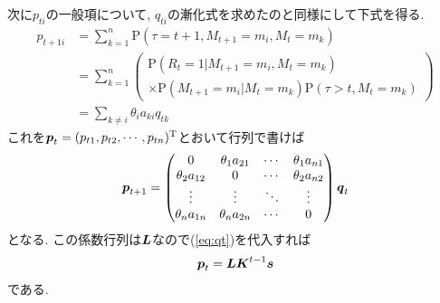 次に$ p_{t i} $の一般項について, $ q_{t i} $の漸化式を求めたのと同様にして下式を得る. 
\begin{align}
    p_{t+1 i} & =\sum_{k=1}^n \mathrm{P}(\tau = t + 1 , M_{t+1} = m_i , M_t = m_k) \\
    & =\sum_{k=1}^n \left(
        \begin{array}{l}
            \mathrm{P}(R_t=1 | M_{t+1}=m_i , M_t=m_k) \\
            \times \mathrm{P}(M_{t+1}=m_i | M_t=m_k) \mathrm{P}(\tau>t , M_t=m_k)
        \end{array}
    \right) \\
    & =\sum_{k \ne i} \theta_i a_{k i} q_{t k} \label{eq:pti_rec}
\end{align}
これを$ \boldsymbol{p}_t = (p_{t 1} , p_{t 2} , \cdots , p_{t n})^\mathrm{T} $とおいて行列で書けば
\begin{equation}
    \boldsymbol{p}_{t + 1} = 
    \begin{pmatrix}
        0 & \theta_1 a_{2 1} & \cdots & \theta_1 a_{n 1} \\
        \theta_2 a_{1 2} & 0 & \cdots & \theta_2 a_{n 2} \\
        \vdots & \vdots & \ddots & \vdots \\
        \theta_n a_{1 n} & \theta_n a_{2 n} & \cdots & 0 \\
    \end{pmatrix}
    \boldsymbol{q}_t
\end{equation}
となる. この係数行列は$ \boldsymbol{L} $なので(\ref{eq:qt})を代入すれば
\begin{equation} \label{eq:pt}
    \boldsymbol{p}_t = \boldsymbol{L} \boldsymbol{K}^{t - 1} \boldsymbol{s}
\end{equation}
である. 

